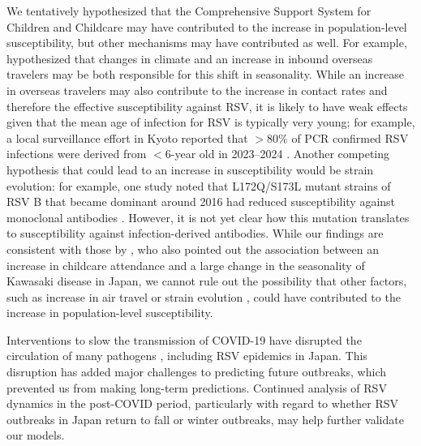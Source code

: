 \documentclass[12pt]{article}
\begin{document}
We tentatively hypothesized that the Comprehensive Support System for Children and Childcare may have contributed to the increase in population-level susceptibility, but other mechanisms may have contributed as well.
For example, \cite{wagatsuma2021shifts} hypothesized that changes in climate and an increase in inbound overseas travelers may be both responsible for this shift in seasonality.
While an increase in overseas travelers may also contribute to the increase in contact rates and therefore the effective susceptibility against RSV, it is likely to have weak effects given that the mean age of infection for RSV is typically very young;
for example, a local surveillance effort in Kyoto reported that $>80\%$ of PCR confirmed RSV infections were derived from $<6$-year old in 2023--2024 \citep{matsumura2025epidemiology}.
Another competing hypothesis that could lead to an increase in susceptibility would be strain evolution:
for example, one study noted that L172Q/S173L mutant strains of RSV B that became dominant around 2016 had reduced susceptibility against monoclonal antibodies \citep{okabe2024amino}.
However, it is not yet clear how this mutation translates to susceptibility against infection-derived antibodies.
While our findings are consistent with those by \cite{dehaan2024age}, who also pointed out the association between an increase in childcare attendance and a large change in the seasonality of Kawasaki disease in Japan, we cannot rule out the possibility that other factors, such as increase in air travel \citep{wagatsuma2021shifts} or strain evolution \citep{okabe2024amino}, could have contributed to the increase in population-level susceptibility.

Interventions to slow the transmission of COVID-19 have disrupted the circulation of many pathogens \citep{baker2020impact,eden2022off,chen2024covid,park2024predicting}, including RSV epidemics in Japan.
This disruption has added major challenges to predicting future outbreaks, which prevented us from making long-term predictions.
Continued analysis of RSV dynamics in the post-COVID period, particularly with regard to whether RSV outbreaks in Japan return to fall or winter outbreaks, may help further validate our models.
\end{document}
